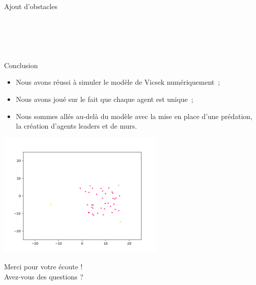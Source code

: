 \documentclass[aspectratio=43, a4paper, 12pt]{beamer}
\begin{document}
\begin{frame}{Ajout d'obstacles}
\end{frame}

\section*{\ }
	\begin{frame}{Conclusion}
		
			\begin{itemize}
				\item<1-> Nous avons réussi à simuler le modèle de Vicsek numériquement~;
				\item<2-> Nous avons joué sur le fait que chaque agent est unique~;
				\item<3-> Nous sommes allés au-delà du modèle avec la mise en place d'une prédation, la création d'agents leaders et de murs.
			\end{itemize}
\end{frame}		
\begin{frame}	
\begin{center} \includegraphics[width=8cm]{images/image_9.png}  \end{center}
\begin{center} Merci pour votre écoute ! \\ Avez-vous des questions ? \end{center}
\end{frame}
\end{document}
